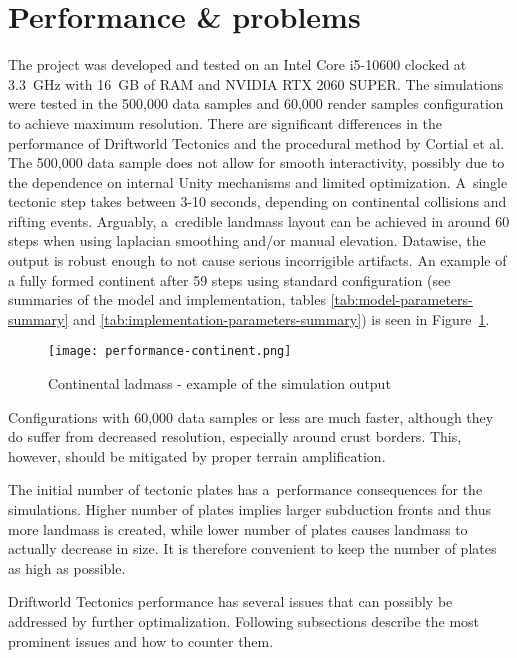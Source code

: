 \section{Performance \& problems}
\label{sec:performance}
The project was developed and tested on an Intel Core i5-10600 clocked at 3.3~GHz with 16~GB of RAM and NVIDIA RTX 2060 SUPER. The simulations were tested in the 500,000 data samples and 60,000 render samples configuration to achieve maximum resolution. There are significant differences in the performance of Driftworld Tectonics and the procedural method by Cortial et al. The 500,000 data sample does not allow for smooth interactivity, possibly due to the dependence on internal Unity mechanisms and limited optimization. A~single tectonic step takes between 3-10 seconds, depending on continental collisions and rifting events. Arguably, a~credible landmass layout can be achieved in around 60 steps when using laplacian smoothing and/or manual elevation. Datawise, the output is robust enough to not cause serious incorrigible artifacts. An example of a fully formed continent after 59 steps using standard configuration (see summaries of the model and implementation, tables \ref{tab:model-parameters-summary} and \ref{tab:implementation-parameters-summary}) is seen in Figure~\ref{fig:output-example}.
\begin{figure}[ht]
\centering
\texttt{[image: performance-continent.png]}
\caption{Continental ladmass - example of the simulation output}
\label{fig:output-example}
\end{figure}

Configurations with 60,000 data samples or less are much faster, although they do suffer from decreased resolution, especially around crust borders. This, however, should be mitigated by proper terrain amplification.

The initial number of tectonic plates has a~performance consequences for the simulations. Higher number of plates implies larger subduction fronts and thus more landmass is created, while lower number of plates causes landmass to actually decrease in size. It is therefore convenient to keep the number of plates as high as possible.

Driftworld Tectonics performance has several issues that can possibly be addressed by further optimalization. Following subsections describe the most prominent issues and how to counter them.

